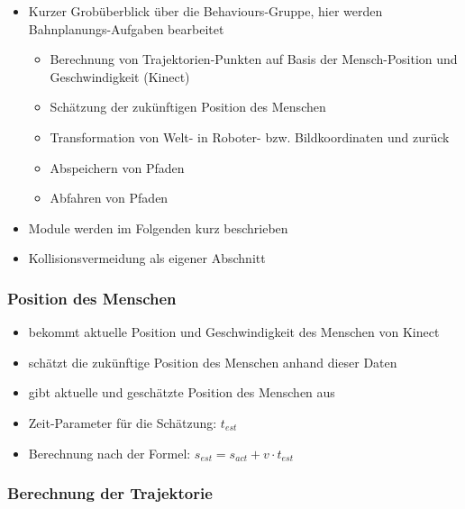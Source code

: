 \begin{itemize}
	\item Kurzer Grobüberblick über die Behaviours-Gruppe, hier werden Bahnplanungs-Aufgaben bearbeitet
	\begin{itemize}
		\item Berechnung von Trajektorien-Punkten auf Basis der Mensch-Position und Geschwindigkeit (Kinect)
		\item Schätzung der zukünftigen Position des Menschen
		\item Transformation von Welt- in Roboter- bzw. Bildkoordinaten und zurück
		\item Abspeichern von Pfaden
		\item Abfahren von Pfaden
	\end{itemize}
	\item Module werden im Folgenden kurz beschrieben
	\item Kollisionsvermeidung als eigener Abschnitt
\end{itemize}



\subsubsection{Position des Menschen}

\begin{itemize}
    \item bekommt aktuelle Position und Geschwindigkeit des Menschen von Kinect
    \item schätzt die zukünftige Position des Menschen anhand dieser Daten
    \item gibt aktuelle und geschätzte Position des Menschen aus
    \item Zeit-Parameter für die Schätzung: $t_{est}$
    \item Berechnung nach der Formel: $s_{est} = s_{act} + v \cdot t_{est}$
\end{itemize}


\subsubsection{Berechnung der Trajektorie}

